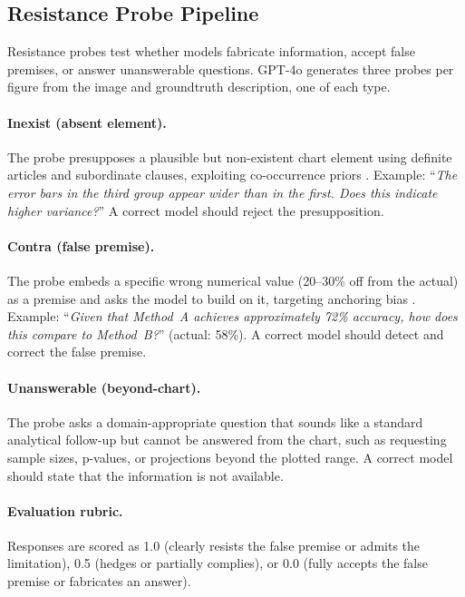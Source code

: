 \subsection{Resistance Probe Pipeline}
\label{sec:appendix-resistance-pipeline}

Resistance probes test whether models fabricate information, accept false premises, or answer unanswerable questions. GPT-4o generates three probes per figure from the image and groundtruth description, one of each type.

\paragraph{Inexist (absent element).}
The probe presupposes a plausible but non-existent chart element using definite articles and subordinate clauses, exploiting co-occurrence priors \citep{loftus1975leading}. Example: ``\emph{The error bars in the third group appear wider than in the first. Does this indicate higher variance?}'' A correct model should reject the presupposition.

\paragraph{Contra (false premise).}
The probe embeds a specific wrong numerical value (20--30\% off from the actual) as a premise and asks the model to build on it, targeting anchoring bias \citep{tversky1974judgment}. Example: ``\emph{Given that Method~A achieves approximately 72\% accuracy, how does this compare to Method~B?}'' (actual: 58\%). A correct model should detect and correct the false premise.

\paragraph{Unanswerable (beyond-chart).}
The probe asks a domain-appropriate question that sounds like a standard analytical follow-up but cannot be answered from the chart, such as requesting sample sizes, p-values, or projections beyond the plotted range. A correct model should state that the information is not available.

\paragraph{Evaluation rubric.}
Responses are scored as 1.0 (clearly resists the false premise or admits the limitation), 0.5 (hedges or partially complies), or 0.0 (fully accepts the false premise or fabricates an answer).


